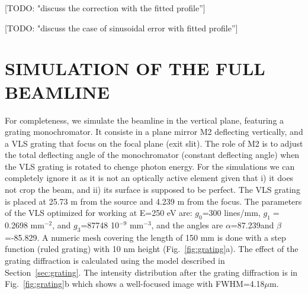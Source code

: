 \documentclass[]{spie}  %
\newcommand{\todo}[1]{{\color{red}[TODO: "#1'']}}
\begin{document}
\todo{discuss the correction with the fitted profile}


\todo{discuss the case of sinusoidal error with fitted profile}



\section{SIMULATION OF THE FULL BEAMLINE}


For completeness, we simulate the beamline in the vertical plane, featuring a grating monochromator. It consiste in a plane mirror M2 deflecting vertically, and a VLS grating that focus on the focal plane (exit slit). The role of M2 is to adjust the total deflecting angle of the monochromator (constant deflecting angle) when the VLS grating is rotated to chenge photon energy. For the simulations we can completely ignore it as it is not an optically active element given that i) it does not crop the beam, and ii) its surface is supposed to be perfect. The VLS grating is placed at 25.73 m from the source and 4.239 m from the focus. The parameters of the VLS optimized for working at E=250 eV are: $g_0$=300 lines/mm, $g_1=$  0.2698 mm$^{-2}$, and $g_3$=87748 10${^{-9}}$ mm$^{-3}$, and the angles are $\alpha$=87.239\textdegree and $\beta$=-85.829\textdegree. A numeric mesh covering the length of 150 mm is done with a step function (ruled grating) with 10 nm height (Fig.~\ref{fig:grating}a). The effect of the grating diffraction is calculated using the model described in Section~\ref{sec:grating}. The intensity distribution after the grating diffraction is in Fig.~\ref{fig:grating}b which shows a well-focused image with FWHM=4.18$\mu$m.
\end{document}
